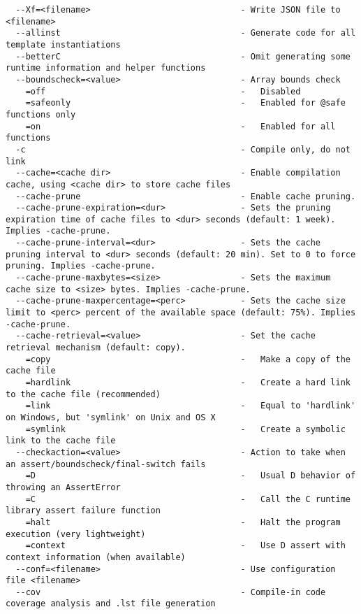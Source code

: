 \documentclass{studrep}
\begin{document}
\begin{verbatim}
  --Xf=<filename>                              - Write JSON file to <filename>
  --allinst                                    - Generate code for all template instantiations
  --betterC                                    - Omit generating some runtime information and helper functions
  --boundscheck=<value>                        - Array bounds check
    =off                                       -   Disabled
    =safeonly                                  -   Enabled for @safe functions only
    =on                                        -   Enabled for all functions
  -c                                           - Compile only, do not link
  --cache=<cache dir>                          - Enable compilation cache, using <cache dir> to store cache files
  --cache-prune                                - Enable cache pruning.
  --cache-prune-expiration=<dur>               - Sets the pruning expiration time of cache files to <dur> seconds (default: 1 week). Implies -cache-prune.
  --cache-prune-interval=<dur>                 - Sets the cache pruning interval to <dur> seconds (default: 20 min). Set to 0 to force pruning. Implies -cache-prune.
  --cache-prune-maxbytes=<size>                - Sets the maximum cache size to <size> bytes. Implies -cache-prune.
  --cache-prune-maxpercentage=<perc>           - Sets the cache size limit to <perc> percent of the available space (default: 75%). Implies -cache-prune.
  --cache-retrieval=<value>                    - Set the cache retrieval mechanism (default: copy).
    =copy                                      -   Make a copy of the cache file
    =hardlink                                  -   Create a hard link to the cache file (recommended)
    =link                                      -   Equal to 'hardlink' on Windows, but 'symlink' on Unix and OS X
    =symlink                                   -   Create a symbolic link to the cache file
  --checkaction=<value>                        - Action to take when an assert/boundscheck/final-switch fails
    =D                                         -   Usual D behavior of throwing an AssertError
    =C                                         -   Call the C runtime library assert failure function
    =halt                                      -   Halt the program execution (very lightweight)
    =context                                   -   Use D assert with context information (when available)
  --conf=<filename>                            - Use configuration file <filename>
  --cov                                        - Compile-in code coverage analysis and .lst file generation

\end{verbatim}
\end{document}
